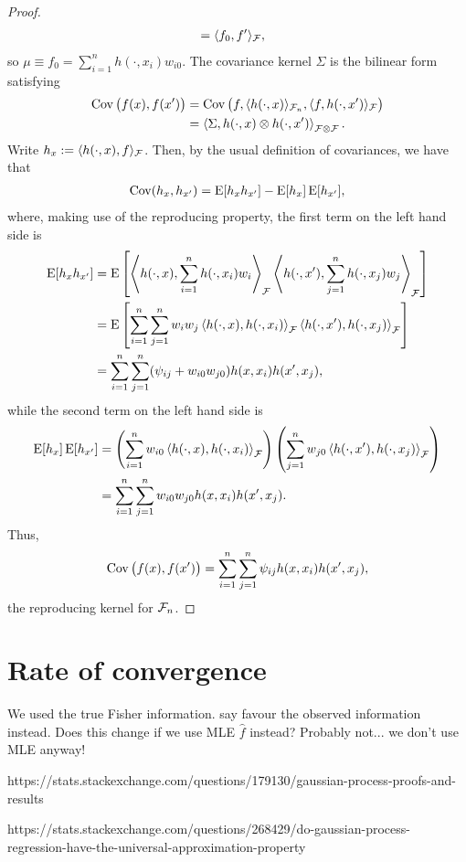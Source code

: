 \documentclass[a4paper,showframe,11pt,draft]{report}
\begin{document}
\begin{proof}
\begin{align*}
    &= \langle f_0,f' \rangle_{{\mathcal F}},
  \end{align*}
  so $\mu \equiv f_0 = \sum_{i=1}^n h(\cdot,x_i)w_{i0}$. 
  The covariance kernel $\Sigma$ is the bilinear form satisfying
  \begin{align*}
    \operatorname{Cov}\big(f(x),f(x')\big) 
    &= \operatorname{Cov}\big(f,\langle h(\cdot,x)\rangle_{{\mathcal F}_n}, \langle f,h(\cdot,x')\rangle_{{\mathcal F}} \big) \\
    &= \left\langle \Sigma, h(\cdot,x) \otimes h(\cdot,x') \right\rangle_{{\mathcal F} \otimes {\mathcal F}}.
  \end{align*}
  Write $h_{x} := \langle h(\cdot,x),f \rangle_{{\mathcal F}}$. 
  Then, by the usual definition of covariances, we have that 
  \begin{align*}
    \operatorname{Cov}(h_x,h_{x'}) = \operatorname{E}[h_xh_{x'}] - \operatorname{E}[h_x]\operatorname{E}[h_{x'}],
  \end{align*}
  where, making use of the reproducing property, the first term on the left hand side is
  \begin{align*}
    \operatorname{E}[h_xh_{x'}] 
    &= \operatorname{E} \left[ 
    \left\langle h(\cdot,x), \sum_{i=1}^n h(\cdot,x_i)w_i \right\rangle_{{\mathcal F}} 
    \left\langle h(\cdot,x'), \sum_{j=1}^n h(\cdot,x_j)w_j \right\rangle_{{\mathcal F}} 
    \right] \\
    &= \operatorname{E} \left[ 
    \sum_{i=1}^n\sum_{j=1}^n w_iw_j \left\langle  h(\cdot,x), h(\cdot,x_i) \right\rangle_{{\mathcal F}} 
     \left\langle h(\cdot,x'), h(\cdot,x_j)\right\rangle_{{\mathcal F}} 
    \right] \\
    &= \sum_{i=1}^n\sum_{j=1}^n (\psi_{ij} + w_{i0}w_{j0}) h(x,x_i) h(x',x_j),
  \end{align*}
  while the second term on the left hand side is
  \begin{align*}
    \operatorname{E}[h_x]\operatorname{E}[h_{x'}]
    &= \left( \sum_{i=1}^n w_{i0} \left\langle  h(\cdot,x), h(\cdot,x_i)  \right\rangle_{{\mathcal F}} \right)
    \left( \sum_{j=1}^n w_{j0} \left\langle  h(\cdot,x'), h(\cdot,x_j)  \right\rangle_{{\mathcal F}} \right) \\
    &= \sum_{i=1}^n \sum_{j=1}^n w_{i0}w_{j0} h(x,x_i)h(x',x_j).
  \end{align*}  
  Thus,
  \[
    \operatorname{Cov}\big( f(x),f(x') \big) = \sum_{i=1}^n\sum_{j=1}^n \psi_{ij} h(x,x_i) h(x',x_j),
  \]
  the reproducing kernel for ${\mathcal F}_n$.
\end{proof}




\section{Rate of convergence}

We used the true Fisher information. \citet{efron1978assessing} say favour the observed information instead. Does this change if we use MLE $\hat f$ instead? Probably not... we don't use MLE anyway!

https://stats.stackexchange.com/questions/179130/gaussian-process-proofs-and-results

https://stats.stackexchange.com/questions/268429/do-gaussian-process-regression-have-the-universal-approximation-property


\newpage


\hClosingStuffStandalone
\end{document}
